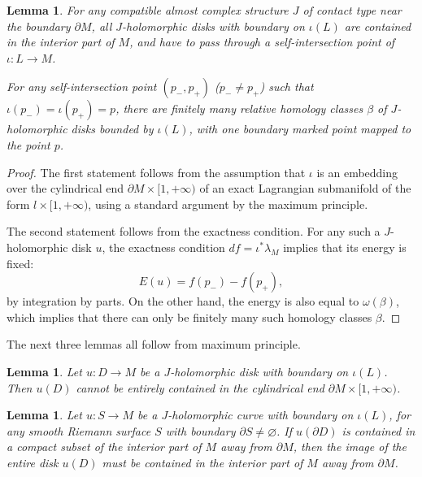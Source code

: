 \documentclass{amsart}
\newtheorem{lemma}[theorem]{Lemma}
\numberwithin{equation}{section}
\numberwithin{figure}{section}
\begin{document}
\begin{lemma}\label{finiteness of pseudoholomorphic disks passing through a self-intersection point}
	For any compatible almost complex structure $J$ of contact type near the boundary $\partial M$, all $J$-holomorphic disks with boundary on $\iota(L)$ are contained in the interior part of $M$, and have to pass through a self-intersection point of $\iota: L \to M$. \par
	For any self-intersection point $(p_{-}, p_{+})$ ($p_{-} \neq p_{+}$) such that $\iota(p_{-}) = \iota(p_{+}) = p$, there are finitely many relative homology classes $\beta$ of $J$-holomorphic disks bounded by $\iota(L)$, with one boundary marked point mapped to the point $p$.
\end{lemma}
\begin{proof}
	The first statement follows from the assumption that $\iota$ is an embedding over the cylindrical end $\partial M \times [1, +\infty)$ of an exact Lagrangian submanifold of the form $l \times [1, +\infty)$, using a standard argument by the maximum principle. \par
	The second statement follows from the exactness condition. For any such a $J$-holomorphic disk $u$, the exactness condition $df = \iota^{*} \lambda_{M}$ implies that its energy is fixed:
\begin{equation*}
E(u) = f(p_{-}) - f(p_{+}),
\end{equation*}
by integration by parts. On the other hand, the energy is also equal to $\omega(\beta)$, which implies that there can only be finitely many such homology classes $\beta$. \par
\end{proof}

	The next three lemmas all follow from maximum principle. \par

\begin{lemma}
	Let $u: D \to M$ be a $J$-holomorphic disk with boundary on $\iota(L)$. Then $u(D)$ cannot be entirely contained in the cylindrical end $\partial M \times [1, +\infty)$.
\end{lemma}

\begin{lemma}
	Let $u: S \to M$ be a $J$-holomorphic curve with boundary on $\iota(L)$, for any smooth Riemann surface $S$ with boundary $\partial S \neq \varnothing$. If $u(\partial D)$ is contained in a compact subset of the interior part of $M$ away from $\partial M$, then the image of the entire disk $u(D)$ must be contained in the interior part of $M$ away from $\partial M$.
\end{lemma}
\end{document}

